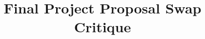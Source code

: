 %
%
% 
%
%
%
%
%
% 
%
%
% 

\documentclass[11pt]{article}

\usepackage[english]{babel}
\usepackage[utf8]{inputenc}
\usepackage[colorlinks = true,
            linkcolor = blue,
            urlcolor  = blue]{hyperref}
\usepackage[a4paper,margin=1.5in]{geometry}
\usepackage{stackengine,graphicx}
\usepackage{fancyhdr}
\setlength{\headheight}{15pt}
\usepackage{microtype}
\usepackage{times}
\usepackage{booktabs}

\usepackage[numbered,framed]{matlab-prettifier}

\frenchspacing
\setlength{\parindent}{0cm} %
\setlength{\parskip}{0.3cm plus1mm minus1mm}

\pagestyle{fancy}
\fancyhf{}
\rfoot{\thepage}

\date{}

\title{\vspace{-1cm}Final Project Proposal Swap Critique}


\maketitle
\vspace{-1cm}
\thispagestyle{fancy}

